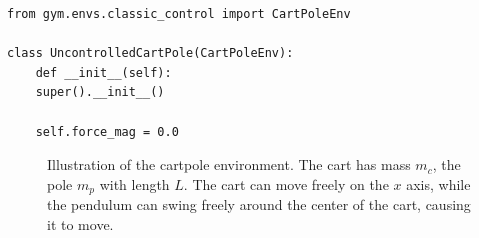 			\begin{lstlisting}[caption={Modification of Gym's cartpole environment to get an uncontrolled cartpole.}, label=lst:uncontrolledCartPole]
from gym.envs.classic_control import CartPoleEnv

class UncontrolledCartPole(CartPoleEnv):
	def __init__(self):
	super().__init__()

	self.force_mag = 0.0
			\end{lstlisting}

			\begin{figure}
				\centering
				\tikzCartpole
				\caption{Illustration of the cartpole environment. The cart has mass \(m_c\), the pole \(m_p\) with length \(L\). The cart can move freely on the \(x\) axis, while the pendulum can swing freely around the center of the cart, causing it to move.}
				\label{fig:envCartpoleGymSketch}
			\end{figure}

